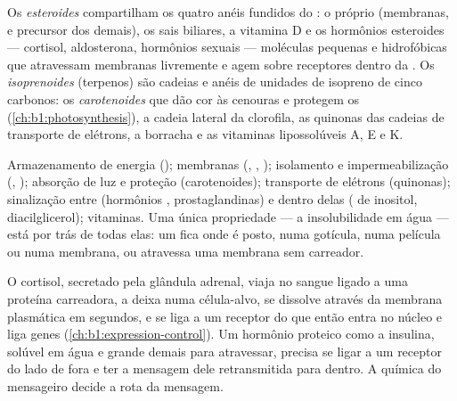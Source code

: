 \begin{definition}\label{def:b1:lipids:steroids}
Os \emph{esteroides} compartilham os quatro anéis
fundidos do : o próprio  (membranas, e precursor dos
demais), os sais biliares, a vitamina D e os hormônios esteroides ---
cortisol, aldosterona, hormônios sexuais --- moléculas pequenas e
hidrofóbicas que atravessam membranas livremente e agem sobre receptores
dentro da . Os \emph{isoprenoides} (terpenos)
são cadeias e anéis de unidades de isopreno de cinco carbonos: os
\emph{carotenoides} que dão cor às cenouras e protegem os 
(\cref{ch:b1:photosynthesis}), a cadeia lateral da clorofila, as
quinonas das cadeias de transporte de elétrons, a borracha e as
vitaminas lipossolúveis A, E e K.
\end{definition}

\begin{proposition}\label{prop:b1:lipids:functions}
Armazenamento de energia (); membranas (,
, ); isolamento e impermeabilização (,
); absorção de luz e proteção (carotenoides); transporte de
elétrons (quinonas); sinalização entre  (hormônios ,
prostaglandinas) e dentro delas ( de inositol,
diacilglicerol); vitaminas. Uma única propriedade --- a insolubilidade
em água --- está por trás de todas elas: um  fica onde é posto,
numa gotícula, numa película ou numa membrana, ou atravessa uma membrana
sem carreador.
\end{proposition}

\begin{example}\label{ex:b1:lipids:steroidhormone}
O cortisol, secretado pela glândula adrenal, viaja no sangue ligado a
uma proteína carreadora, a deixa numa célula-alvo, se dissolve através
da membrana plasmática em segundos, e se liga a um receptor do 
que então entra no núcleo e liga genes
(\cref{ch:b1:expression-control}). Um hormônio proteico como a insulina,
solúvel em água e grande demais para atravessar, precisa se ligar a um
receptor do lado de fora e ter a mensagem dele retransmitida para
dentro. A química do mensageiro decide a rota da mensagem.
\end{example}


